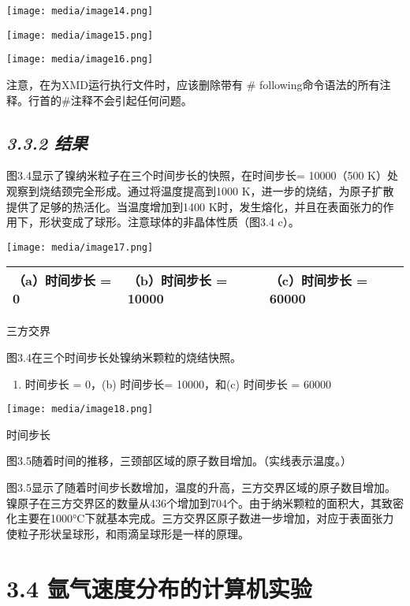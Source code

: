 \documentclass[
]{article}
\begin{document}
\texttt{[image: media/image14.png]}

\texttt{[image: media/image15.png]}

\texttt{[image: media/image16.png]}

注意，在为XMD运行执行文件时，应该删除带有 \#
following命令语法的所有注释。行首的\#注释不会引起任何问题。

\hypertarget{ux7ed3ux679c-2}{%
\subsection{\texorpdfstring{\emph{3.3.2
结果}}{3.3.2 结果}}\label{ux7ed3ux679c-2}}

图3.4显示了镍纳米粒子在三个时间步长的快照，在时间步长= 10000（500
K）处观察到烧结颈完全形成。通过将温度提高到1000
K，进一步的烧结，为原子扩散提供了足够的热活化。当温度增加到1400
K时，发生熔化，并且在表面张力的作用下，形状变成了球形。注意球体的非晶体性质（图3.4
c）。

\texttt{[image: media/image17.png]}

\begin{longtable}[]{@{}lll@{}}
\toprule
\endhead
（a）时间步长 = 0 & （b）时间步长 = 10000 & （c）时间步长 = 60000 \\
\bottomrule
\end{longtable}

三方交界

图3.4在三个时间步长处镍纳米颗粒的烧结快照。

\begin{enumerate}
\def\labelenumi{\alph{enumi}.}
\item
  时间步长 = 0，(b) 时间步长= 10000，和(c) 时间步长 = 60000
\end{enumerate}

\texttt{[image: media/image18.png]}

时间步长

图3.5随着时间的推移，三颈部区域的原子数目增加。（实线表示温度。）

图3.5显示了随着时间步长数增加，温度的升高，三方交界区域的原子数目增加。镍原子在三方交界区的数量从436个增加到704个。由于纳米颗粒的面积大，其致密化主要在1000°C下就基本完成。三方交界区原子数进一步增加，对应于表面张力使粒子形状呈球形，和雨滴呈球形是一样的原理。

\hypertarget{ux6c29ux6c14ux901fux5ea6ux5206ux5e03ux7684ux8ba1ux7b97ux673aux5b9eux9a8c}{%
\section{3.4
氩气速度分布的计算机实验}\label{ux6c29ux6c14ux901fux5ea6ux5206ux5e03ux7684ux8ba1ux7b97ux673aux5b9eux9a8c}}
\end{document}
